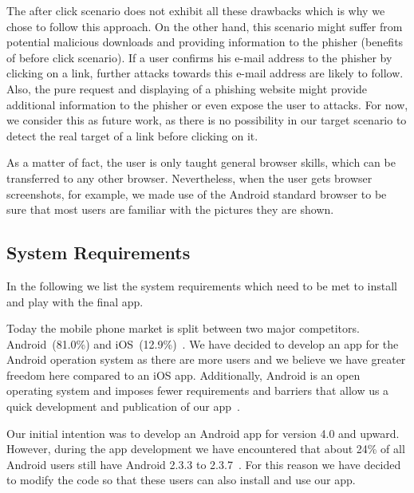 \begin{description}[leftmargin=0cm]
The after click scenario does not exhibit all these drawbacks which is why we chose to follow this approach.
On the other hand, this scenario might suffer from potential malicious downloads and providing information to the phisher (benefits of before click scenario).
If a user confirms his e-mail address to the phisher by clicking on a link, further attacks towards this e-mail address are likely to follow.
Also, the pure request and displaying of a phishing website might provide additional information to the phisher or even expose the user to attacks.
For now, we consider this as future work, as there is no possibility in our target scenario to detect the real target of a link before clicking on it.

	\item[Considered Browser] As a matter of fact, the user is only taught general browser skills, which can be transferred to any other browser.
Nevertheless, when the user gets browser screenshots, for example, we made use of the Android standard browser to be sure that most users are familiar with the pictures they are shown.
\end{description}	

\subsection{System Requirements}
In the following we list the system requirements which need to be met to install and play with the final app.


\begin{description}[leftmargin=0cm]
	\item[Android] Today the mobile phone market is split between two major competitors. Android~(81.0\%) and iOS~(12.9\%)~\cite{androidiosmarketshare}. 
	We have decided to develop an app for the Android operation system as there are more users and we believe we have greater freedom here compared to an iOS app. 
 	Additionally, Android is an open operating system and imposes fewer requirements and barriers that allow us a quick development and publication of our app~\cite{publishios, publishandroid}. 
	\item[Version] Our initial intention was to develop an Android app for version 4.0 and upward.
 However, during the app development we have encountered that about 24\% of all Android users still have Android 2.3.3 to 2.3.7~\cite{versionsandroid}. For this reason we have decided to modify the code so that these users can also install and use our app.
 
\end{description}


